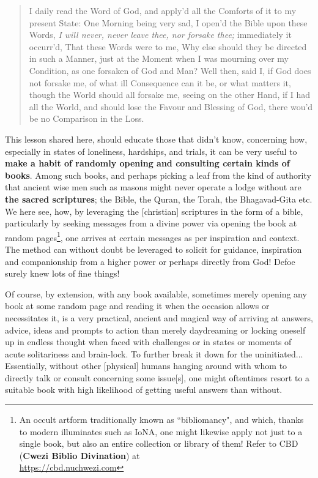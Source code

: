 \documentclass[a4paper]{article}
\begin{document}
\noindent
\begin{minipage}{1\textwidth}
\vspace{1em}
\begin{quotation}
{\ttfamily


I daily read the Word of God, and apply’d all the Comforts of it to my present State: One Morning being very sad, I open’d the Bible upon these Words, \textit{I will never, never leave thee, nor forsake thee;} immediately it occurr’d, That these Words were to me, Why else should they be directed in such a Manner, just at the Moment when I was mourning over my Condition, as one forsaken of God and Man? Well then, said I, if God does not forsake me, of what ill Consequence can it be, or what matters it, though the World should all forsake me, seeing on the other Hand, if I had all the World, and should lose the Favour and Blessing of God, there wou’d be no Comparison in the Loss.


}
\end{quotation}
\vspace{1em}
\end{minipage}


This lesson shared here, should educate those that didn't know, concerning how, especially in states of loneliness, hardships, and trials, it can be very useful to \textbf{make a habit of randomly opening and consulting certain kinds of books}. Among such books, and perhaps picking a leaf from the kind of authority that ancient wise men such as masons might never operate a lodge without are \textbf{the sacred scriptures}; the Bible, the Quran, the Torah, the Bhagavad-Gita etc. We here see, how, by leveraging the [christian] scriptures in the form of a bible, particularly by seeking messages from a divine power via opening the book at random pages\footnote{An occult artform traditionally known as ``bibliomancy", and which, thanks to modern illuminates such as IoNA, one might likewise apply not just to a single book, but also an entire collection or library of them! Refer to CBD (\textbf{Cwezi Biblio Divination}) at\\ \url{https://cbd.nuchwezi.com}}, one arrives at certain messages as per inspiration and context. The method can without doubt be leveraged to solicit for guidance, inspiration and companionship from a higher power or perhaps directly from God! Defoe surely knew lots of fine things!


Of course, by extension, with any book available, sometimes merely opening any book at some random page and reading it when the occasion allows or necessitates it, is a very practical, ancient and magical way of arriving at answers, advice, ideas and prompts to action than merely daydreaming or locking oneself up in endless thought when faced with challenges or in states or moments of acute solitariness and brain-lock. To further break it down for the uninitiated... Essentially, without other [physical] humans hanging around with whom to directly talk or consult concerning some issue[s], one might oftentimes resort to a suitable book with high likelihood of getting useful answers than without.
\end{document}
